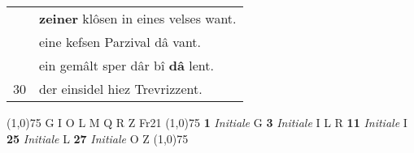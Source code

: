 \documentclass[8pt,a4paper,notitlepage]{article}
\begin{document}
\begin{table}[ht]
\begin{minipage}[t]{0.5\linewidth}
\begin{tabular}{rl}
 & \textbf{zeiner} klôsen in eines velses want.\\ 
 & eine kefsen Parzival dâ vant.\\ 
 & ein gemâlt sper dâr bî \textbf{dâ} lent.\\ 
30 & der einsidel hiez Trevrizzent.\\ 
\end{tabular}
\scriptsize
\line(1,0){75} \newline
G I O L M Q R Z Fr21 \newline
\line(1,0){75} \newline
\textbf{1} \textit{Initiale} G  \textbf{3} \textit{Initiale} I L R  \textbf{11} \textit{Initiale} I  \textbf{25} \textit{Initiale} L  \textbf{27} \textit{Initiale} O Z  \newline
\line(1,0){75} \newline

\end{minipage}
\end{table}
\end{document}
